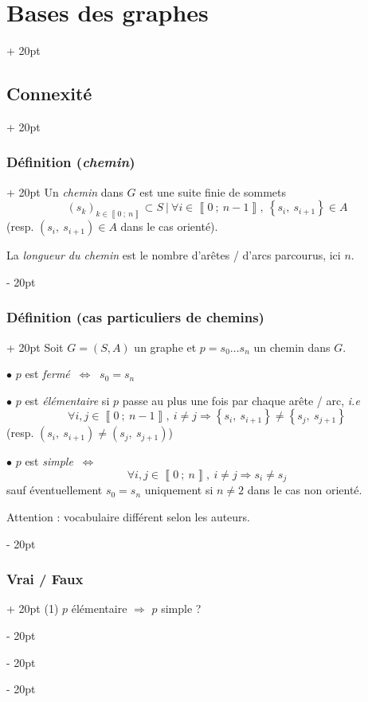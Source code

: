 \documentclass[a4paper, 12pt, twoside]{article}
\newcommand{\nset}[2]{\left\llbracket #1\ ;\ #2 \right\rrbracket}
\newcommand{\set}[1]{\left\{ #1 \right\}}
\newcommand{\ssi}{\ \Leftrightarrow \ }
\newcommand{\ind}[1][20pt]{\advance\leftskip + #1}
\newcommand{\deind}[1][20pt]{\advance\leftskip - #1}
\newenvironment{indt}[2][20pt]{#2 \par \ind[#1]}{\par \deind} %
\begin{document}
\begin{indt}{\section{Bases des graphes}}
\begin{indt}{\subsection{Connexité}}
\begin{indt}{\subsubsection{Définition (\textit{chemin})}}
                Un \textit{chemin} dans $G$ est une suite finie de sommets
                \[
                    (s_k)_{k \in \nset 0 n} \subset S\ |\ \forall i \in \nset{0}{n - 1},\ \set{s_i,\ s_{i + 1}} \in A
                \]
                (resp. $(s_i, \ s_{i + 1}) \in A$ dans le cas orienté).

                \vspace{12pt}
                
                La \textit{longueur du chemin} est le nombre d'arêtes / d'arcs parcourus, ici $n$.
            \end{indt}

            \vspace{12pt}
            
            \begin{indt}{\subsubsection{Définition (cas particuliers de chemins)}}
                Soit $G = (S, A)$ un graphe et $p = s_0 \ldots s_n$ un chemin dans $G$.

                $\bullet$ $p$ est \textit{fermé} $\ssi$ $s_0 = s_n$

                $\bullet$ $p$ est \textit{élémentaire} si $p$ passe au plus une fois par chaque arête / arc, \textit{i.e}
                \[
                    \forall i, j \in \nset{0}{n - 1},\ i \neq j \Rightarrow \set{s_i,\ s_{i + 1}} \neq \set{s_j,\ s_{j + 1}}
                \]
                (resp. $(s_i,\ s_{i + 1}) \neq (s_j,\ s_{j + 1})$)

                \vspace{12pt}
                
                $\bullet$ $p$ est \textit{simple} $\ssi$
                \[
                    \forall i, j \in \nset{0}{n},\ i \neq j \Rightarrow s_i \neq s_j
                \]
                sauf éventuellement $s_0 = s_n$ uniquement si $n \neq 2$ dans le cas non orienté.
                \vspace{12pt}
                
                Attention : vocabulaire différent selon les auteurs.
            \end{indt}

            \vspace{12pt}
            
            \begin{indt}{\subsubsection{Vrai / Faux}}
                (1) $p$ élémentaire $\Rightarrow$ $p$ simple ?


\end{indt}
\end{indt}
\end{indt}
\end{document}
